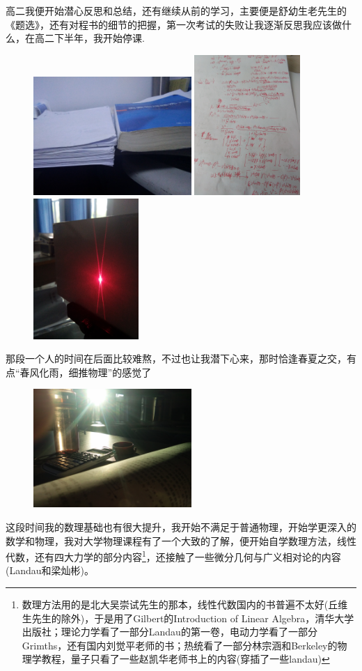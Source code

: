 \documentclass[hyperref,UTF8]{ctexart}
\begin{document}
高二我便开始潜心反思和总结，还有继续从前的学习，主要便是舒幼生老先生的《题选》，还有对程书的细节的把握，第一次考试的失败让我逐渐反思我应该做什么，在高二下半年，我开始停课.
\begin{figure}[H]
    \centering
    \includegraphics[width=6cm]{IMG_20190425_003812.jpg}
    \includegraphics[width=4cm]{IMG_20190530_080259.jpg}
    \includegraphics[width=4cm]{IMG_20190529_184626.jpg}
\end{figure}
那段一个人的时间在后面比较难熬，不过也让我潜下心来，那时恰逢春夏之交，有点“春风化雨，细推物理”的感觉了
\begin{figure}[H]
    \centering
    \includegraphics[width=6cm]{IMG_20190520_184311.jpg}
\end{figure}
这段时间我的数理基础也有很大提升，我开始不满足于普通物理，开始学更深入的数学和物理，我对大学物理课程有了一个大致的了解，便开始自学数理方法，线性代数，还有四大力学的部分内容\footnote{数理方法用的是北大吴崇试先生的那本，线性代数国内的书普遍不太好(丘维生先生的除外)，于是用了Gilbert的Introduction of Linear Algebra，清华大学出版社；理论力学看了一部分Landau的第一卷，电动力学看了一部分Grimths，还有国内刘觉平老师的书；热统看了一部分林宗涵和Berkeley的物理学教程，量子只看了一些赵凯华老师书上的内容(穿插了一些landau)}，还接触了一些微分几何与广义相对论的内容(Landau和梁灿彬)。
\end{document}
